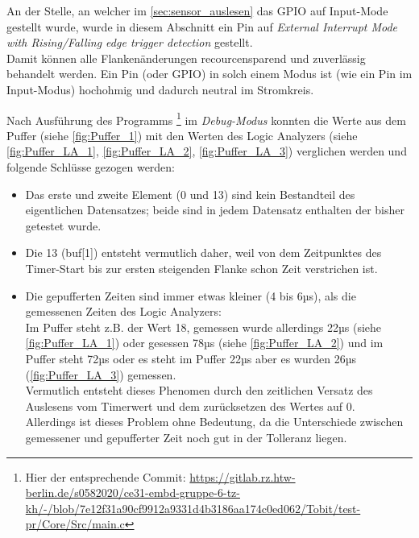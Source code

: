 \documentclass[11pt,a4paper,titlepage]{article}
\begin{document}
An der Stelle, an welcher im \cref{sec:sensor_auslesen} das GPIO auf Input-Mode gestellt wurde,
wurde in diesem Abschnitt ein Pin auf \textit{External Interrupt Mode with Rising/Falling edge trigger detection} gestellt.\\
Damit können alle Flankenänderungen recourcensparend und zuverlässig behandelt werden.
Ein Pin (oder GPIO) in solch einem Modus ist (wie ein Pin im Input-Modus) hochohmig und dadurch neutral im Stromkreis.

Nach Ausführung des Programms
\footnote{Hier der entsprechende Commit: \url{https://gitlab.rz.htw-berlin.de/s0582020/ce31-embd-gruppe-6-tz-kh/-/blob/7e12f31a90cf9912a9331d4b3186aa174c0ed062/Tobit/test-pr/Core/Src/main.c}}
im \textit{Debug-Modus} konnten die Werte aus dem Puffer (siehe \cref{fig:Puffer_1}) mit den Werten des Logic Analyzers (siehe \cref{fig:Puffer_LA_1}, \cref{fig:Puffer_LA_2}, \cref{fig:Puffer_LA_3}) verglichen werden
und folgende Schlüsse gezogen werden:
\begin{itemize}
    \item Das erste und zweite Element (0 und 13) sind kein Bestandteil des eigentlichen Datensatzes;
          beide sind in jedem Datensatz enthalten der bisher getestet wurde.
    \item Die 13 (buf[1]) entsteht vermutlich daher, weil von dem Zeitpunktes des Timer-Start bis zur ersten steigenden Flanke schon Zeit verstrichen ist.
    \item Die gepufferten Zeiten sind immer etwas kleiner (4 bis 6µs), als die gemessenen Zeiten des Logic Analyzers:\\
          Im Puffer steht z.B. der Wert 18, gemessen wurde allerdings 22µs (siehe \cref{fig:Puffer_LA_1})
          oder gesessen 78µs (siehe \cref{fig:Puffer_LA_2}) und im Puffer steht 72µs
          oder es steht im Puffer 22µs aber es wurden 26µs (\cref{fig:Puffer_LA_3}) gemessen.\\
          Vermutlich entsteht dieses Phenomen durch den zeitlichen Versatz des Auslesens vom Timerwert und dem zurücksetzen des Wertes auf 0.\\
          Allerdings ist dieses Problem ohne Bedeutung, da die Unterschiede zwischen gemessener und gepufferter Zeit noch gut in der Tolleranz liegen.
\end{itemize}
\end{document}
